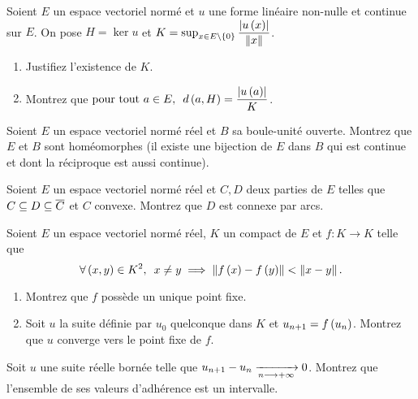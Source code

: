 \begin{exosss}[Exercice 33]
Soient \(E\) un espace vectoriel normé et \(u\) une forme linéaire non-nulle et continue sur \(E\). On pose \(H=\ker u\) et \(K=\sup_{x\in E\excluant\accol{0}}\dfrac{\abs{u\paren{x}}}{\norme{x}}\).

\begin{enumerate}
    \item Justifiez l'existence de \(K\). \\
    \item Montrez que \(\quantifs{\tpt a\in E}d\paren{a,H}=\dfrac{\abs{u\paren{a}}}{K}\).
\end{enumerate}
\end{exosss}



\begin{exo}
Soient \(E\) un espace vectoriel normé réel et \(B\) sa boule-unité ouverte. Montrez que \(E\) et \(B\) sont homéomorphes (\ie il existe une bijection de \(E\) dans \(B\) qui est continue et dont la réciproque est aussi continue).
\end{exo}



\begin{exo}
Soient \(E\) un espace vectoriel normé réel et \(C,D\) deux parties de \(E\) telles que \(C\subseteq D\subseteq\overline{C}\) et \(C\) convexe. Montrez que \(D\) est connexe par arcs.
\end{exo}



\begin{exo}
Soient \(E\) un espace vectoriel normé réel, \(K\) un compact de \(E\) et \(f:K\to K\) telle que \[\quantifs{\forall\paren{x,y}\in K^2}x\not=y\imp\norme{f\paren{x}-f\paren{y}}<\norme{x-y}.\]

\begin{enumerate}
    \item Montrez que \(f\) possède un unique point fixe. \\
    \item Soit \(u\) la suite définie par \(u_0\) quelconque dans \(K\) et \(u_{n+1}=f\left(u_n\right)\). Montrez que \(u\) converge vers le point fixe de \(f\).
\end{enumerate}
\end{exo}



\begin{exo}
Soit \(u\) une suite réelle bornée telle que \(u_{n+1}-u_n\xrightarrow[n\longrightarrow+\infty]{}0\). Montrez que l'ensemble de ses valeurs d'adhérence est un intervalle.
\end{exo}



